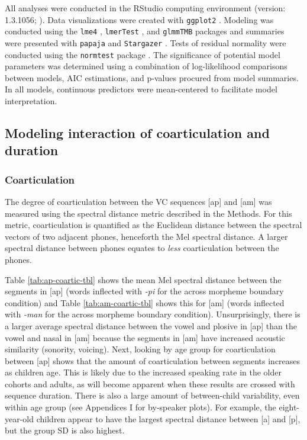 \documentclass[a4paper,man,floatsintext,natbib,donotrepeattitle, apacite]{apa6}
\begin{document}
All analyses were conducted in the RStudio computing environment (version: 1.3.1056; \citealt{rstudioteamRStudioIntegratedDevelopment2020}). Data visualizations were created with \texttt{ggplot2} \citep{wickhamGgplot2ElegantGraphics2016}. Modeling was conducted using the \texttt{lme4} \citep{batesFittingLinearMixedeffects2015}, \texttt{lmerTest} \citep{kuznetsovaLmerTestPackageTests2017}, and \texttt{glmmTMB} \citep{brooksGlmmTMBBalancesSpeed2017} packages and summaries were presented with \texttt{papaja} \citep{austPapajaCreateAPA2018} and \texttt{Stargazer} \citep{hlavacStargazerWellFormattedRegression2018}. Tests of residual normality were conducted using the \texttt{normtest} package \citep{gavrilovNormtestTestsNormality2014}. The significance of potential model parameters was determined using a combination of log-likelihood comparisons between models, AIC estimations, and p-values procured from model summaries. In all models, continuous predictors were mean-centered to facilitate model interpretation.


{%
\subsection{Modeling interaction of coarticulation and duration}\label{modelling-interaction-of-coarticulation-and-duration}}

\subsubsection{Coarticulation}\label{coarticulation}

The degree of coarticulation between the VC sequences {[}ap{]} and {[}am{]} was measured using the spectral distance metric described in the Methods. For this metric, coarticulation is quantified as the Euclidean distance between the spectral vectors of two adjacent phones, henceforth the Mel spectral distance. A larger spectral distance between phones equates to \emph{less} coarticulation between the phones.


Table \ref{tab:ap-coartic-tbl} shows the mean Mel spectral distance between the segments in {[}ap{]} (words inflected with \emph{-pi} for the across morpheme boundary condition) and Table \ref{tab:am-coartic-tbl} shows this for {[}am{]} (words inflected with \emph{-man} for the across morpheme boundary condition). Unsurprisingly, there is a larger average spectral distance between the vowel and plosive in {[}ap{]} than the vowel and nasal in {[}am{]} because the segments in {[}am{]} have increased acoustic similarity (sonority, voicing). Next, looking by age group for coarticulation between {[}ap{]} shows that the amount of coarticulation between segments increases as children age. This is likely due to the increased speaking rate in the older cohorts and adults, as will become apparent when these results are crossed with sequence duration. There is also a large amount of between-child variability, even within age group (see Appendices I for by-speaker plots). For example, the eight-year-old children appear to have the largest spectral distance between {[}a{]} and {[}p{]}, but the group SD is also highest.
\end{document}
